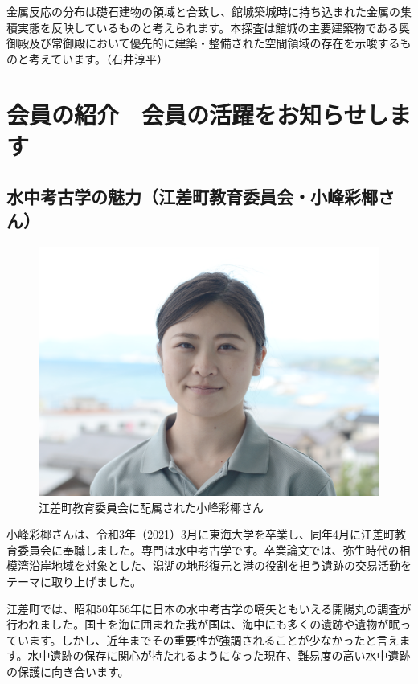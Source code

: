 \documentclass[a4j,11pt,twocolumn,openany]{jsbook}
\begin{document}
金属反応の分布は礎石建物の領域と合致し、館城築城時に持ち込まれた金属の集積実態を反映しているものと考えられます。本探査は館城の主要建築物である奥御殿及び常御殿において優先的に建築・整備された空間領域の存在を示唆するものと考えています。\hspace{2zw}（石井淳平）

\chapter{会員の紹介　会員の活躍をお知らせします}

\section{水中考古学の魅力（江差町教育委員会・小峰彩椰さん）}

\begin{figure}[H]
	\centering
	\includegraphics[width=\linewidth]{fig/02_Komine/Komine01.png}
	\caption{江差町教育委員会に配属された小峰彩椰さん}
	\label{}
	\vspace{-\baselineskip}
\end{figure}

小峰彩椰さんは、令和3年（2021）3月に東海大学を卒業し、同年4月に江差町教育委員会に奉職しました。専門は水中考古学です。卒業論文では、弥生時代の相模湾沿岸地域を対象とした、潟湖の地形復元と港の役割を担う遺跡の交易活動をテーマに取り上げました。

江差町では、昭和50年56年に日本の水中考古学の嚆矢ともいえる開陽丸の調査が行われました。国土を海に囲まれた我が国は、海中にも多くの遺跡や遺物が眠っています。しかし、近年までその重要性が強調されることが少なかったと言えます。水中遺跡の保存に関心が持たれるようになった現在、難易度の高い水中遺跡の保護に向き合います。
\end{document}
